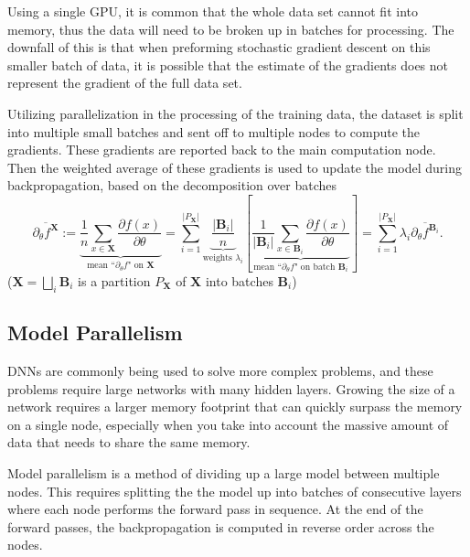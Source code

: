 \documentclass{article}
\newcommand{\X}{\mathbf{X}}
\newcommand{\B}{\mathbf{B}}
\begin{document}
Using a single GPU, it is common that the whole data set cannot fit into memory, thus the data will need to be broken up in batches for processing. The downfall of this is that when preforming stochastic gradient descent on this smaller batch of data, it is possible that the estimate of the gradients does not represent the gradient of the full data set.

Utilizing parallelization in the processing of the training data, the dataset is split into multiple small batches and sent off to multiple nodes to compute the gradients. These gradients are reported back to the main computation node. Then the weighted average of these gradients is used to update the model during backpropagation, based on the decomposition over batches
$$
\overline{\partial_\theta f ^{\X}} :=
\underset{\text{mean ``$\partial_\theta f$" on $\X$}}{\underbrace{
\frac{1}{n} \sum_{x \in \X}\frac{\partial f(x)}{\partial \theta}}}
= \sum_{i=1} ^{|P_{\X}|} \underset{\text{weights $\lambda_i$}}
{\underbrace{
\frac{|\B_i|}{n}}
}
\left[
\underset{\text{mean ``$\partial_\theta f$" on batch $\B_i$}}{\underbrace{
\frac{1}{|\B_i|} \sum_{x \in \B_i}\frac{\partial f(x)}{\partial \theta}}}
\right]
= \sum_{i=1} ^{|P_{\X}|} \lambda_i \overline{\partial_\theta f ^{\B_i}}.
$$
($\X = \bigsqcup_i \B_i$ is a partition $P_{\X}$ of $\X$ into batches $\B_i$)

\subsection{Model Parallelism}
DNNs are commonly being used to solve more complex problems, and these problems require large networks with many hidden layers. Growing the size of a network requires a larger memory footprint that can quickly surpass the memory on a single node, especially when you take into account the massive amount of data that needs to share the same memory.

Model parallelism is a method of dividing up a large model between multiple nodes. This requires splitting the the model up into batches of consecutive layers where each node performs the forward pass in sequence. At the end of the forward passes, the backpropagation is computed in reverse order across the nodes.
\end{document}
